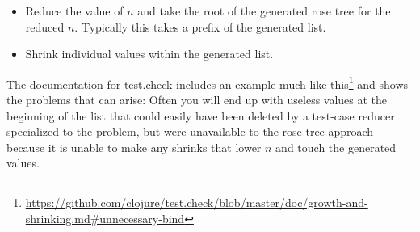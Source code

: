 \begin{itemize}
\item Reduce the value of \(n\) and take the root of the generated rose tree for the reduced \(n\).
Typically this takes a prefix of the generated list.
\item Shrink individual values within the generated list.
\end{itemize}

The documentation for test.check includes an example much like this\footnote{\url{https://github.com/clojure/test.check/blob/master/doc/growth-and-shrinking.md\#unnecessary-bind}} and shows the problems that can arise:
Often you will end up with useless values at the beginning of the list that could easily have been deleted by a test-case reducer specialized to the problem,
but were unavailable to the rose tree approach because it is unable to make any shrinks that lower \(n\) and touch the generated values.



